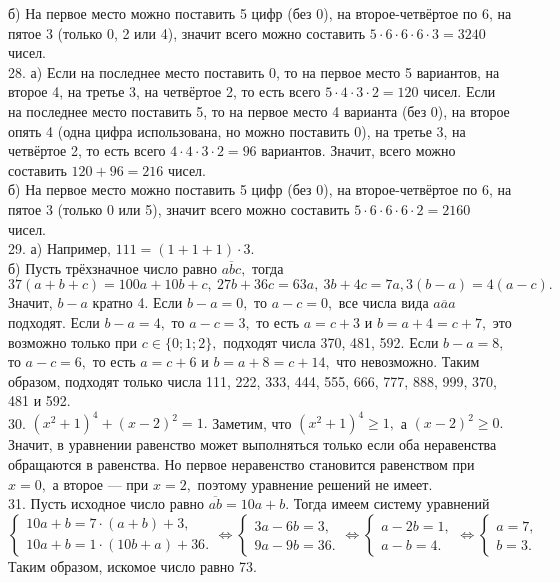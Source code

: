 б) На первое место можно поставить 5 цифр (без 0), на второе-четвёртое по 6, на пятое 3 (только 0, 2 или 4), значит всего можно составить $5\cdot6\cdot6\cdot6\cdot3=3240$ чисел.\\
28. а) Если на последнее место поставить 0, то на первое место 5 вариантов, на второе 4, на третье 3, на четвёртое 2, то есть всего $5\cdot4\cdot3\cdot2=120$ чисел. Если на последнее место поставить 5, то на первое место 4 варианта (без 0), на второе опять 4 (одна цифра использована, но можно поставить 0), на третье 3, на четвёртое 2, то есть всего $4\cdot4\cdot3\cdot2=96$ вариантов. Значит, всего можно составить $120+96=216$ чисел.\\
б) На первое место можно поставить 5 цифр (без 0), на второе-четвёртое по 6, на пятое 3 (только 0 или 5), значит всего можно составить $5\cdot6\cdot6\cdot6\cdot2=2160$ чисел.\\
29. а) Например, $111=(1+1+1)\cdot3.$\\
б) Пусть трёхзначное число равно $\overline{abc},$ тогда $37(a+b+c)=100a+10b+c,\ 27b+36c=63a,\ 3b+4c=7a, 3(b-a)=4(a-c).$ Значит, $b-a$ кратно 4. Если $b-a=0,$ то $a-c=0,$ все числа вида $\overline{aaa}$ подходят. Если $b-a=4,$ то $a-c=3,$ то есть $a=c+3$ и $b=a+4=c+7,$ это возможно только при $c\in\{0;1;2\},$ подходят числа 370, 481, 592. Если $b-a=8,$ то $a-c=6,$ то есть $a=c+6$ и $b=a+8=c+14,$ что невозможно. Таким образом, подходят только числа 111, 222, 333, 444, 555, 666, 777, 888, 999, 370, 481 и 592.\\
30. $(x^2+1)^4+(x-2)^2=1.$ Заметим, что $(x^2+1)^4\geqslant1,$ а $(x-2)^2\geqslant0.$ Значит, в уравнении равенство может выполняться только если оба неравенства обращаются в равенства. Но первое неравенство становится равенством при $x=0,$ а второе --- при $x=2,$ поэтому уравнение решений не имеет.\\
31. Пусть исходное число равно $\overline{ab}=10a+b.$ Тогда имеем систему уравнений \\$\begin{cases} 10a+b=7\cdot(a+b)+3,\\ 10a+b=1\cdot(10b+a)+36.\end{cases}\Leftrightarrow \begin{cases} 3a-6b=3,\\ 9a-9b=36.\end{cases}\Leftrightarrow \begin{cases} a-2b=1,\\ a-b=4.\end{cases}
\Leftrightarrow \begin{cases} a=7,\\ b=3.\end{cases}$ Таким образом, искомое число равно 73.\\
